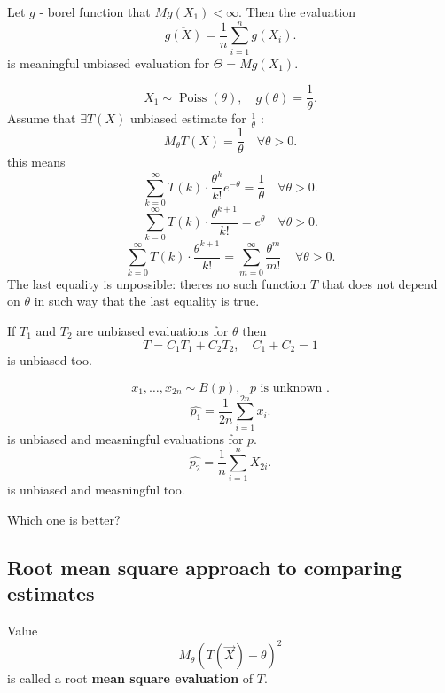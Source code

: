 \begin{corollary}
    Let $g$ - borel function that $Mg(X_1) < \infty$.
    Then the evaluation \[
    \overline{g(X)} = \frac{1}{n}\sum_{i=1}^{n} g(X_i)
    .\] is meaningful unbiased evaluation for $\Theta = Mg(X_1)$.
\end{corollary}

\begin{example}
    \[
    X_1 \sim \operatorname{Poiss} (\theta), \quad
    g(\theta) = \frac{1}{\theta}
    .\] 
    Assume that $\exists T(X)$ unbiased estimate for $\frac{1}{\theta}$ :
    \[
    M_{\theta} T(X) = \frac{1}{\theta} \quad \forall \theta > 0
    .\] 
    this means
    \[
    \sum_{k=0}^{\infty} T(k) \cdot \frac{\theta^{k}}{k!} e^{-\theta} =
    \frac{1}{\theta} \quad \forall \theta > 0
    .\] 
    \[
    \sum_{k=0}^{\infty} T(k) \cdot \frac{\theta^{k+1}}{k!} =
    e^{\theta} \quad \forall \theta > 0
    .\] 
    \[
    \sum_{k=0}^{\infty} T(k) \cdot \frac{\theta^{k+1}}{k!} =
    \sum_{m=0}^{\infty} \frac{\theta^{m}}{m!} \;\;\;\; \forall \theta > 0
    .\] 
    The last equality is unpossible: theres no such function $T$
    that does not depend on $\theta$ in such way that the last
    equality is true.
\end{example}
\begin{remark}
    If $T_1$ and $T_2$ are unbiased evaluations for $\theta$ then \[
    T = C_1 T_1 + C_2 T_2 , \quad C_1 + C_2 = 1
    \] is unbiased too.
\end{remark}

\begin{example}
    \[
    x_1, \ldots, x_{2n} \sim B(p), \text{ $p$ is unknown }
    .\] 
    \[
        \hat{p_1} = \frac{1}{2n} \sum_{i=1}^{2n} x_i
    .\]  is unbiased and measningful evaluations for $p$.
    \[
    \hat{p_2} = \frac{1}{n} \sum_{i=1}^{n} X_{2i}
    .\] is unbiased and measningful too. 

    Which one is better?
\end{example}



\subsection{Root mean square approach to comparing estimates}

\begin{definition}[RMS]
    Value \[
        M_{\theta} (T(\vec{X}) - \theta) ^2
    \] is called a root
    \textbf{mean square evaluation} of $T$.
\end{definition}

